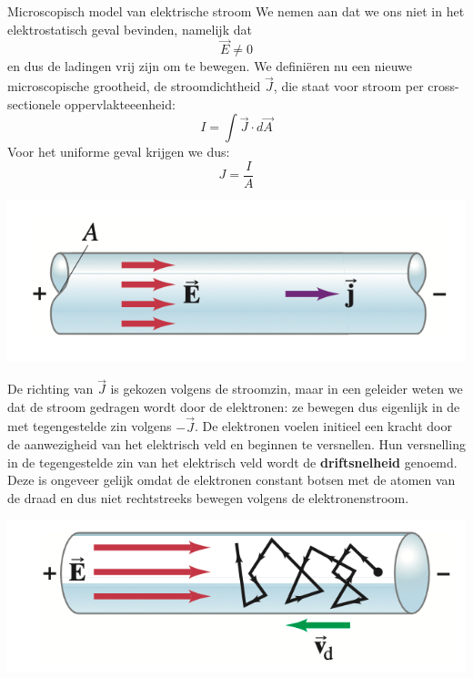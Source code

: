 \begin{app}{Microscopisch model van elektrische stroom}
    We nemen aan dat we ons niet in het elektrostatisch geval bevinden, namelijk dat
    \begin{equation*}
        \Vec{E} \neq 0
    \end{equation*}
    en dus de ladingen vrij zijn om te bewegen. We definiëren nu een nieuwe microscopische grootheid, de stroomdichtheid $\Vec{J}$, die staat voor stroom per cross-sectionele oppervlakteeenheid: 
    \begin{equation*}
        I = \int \Vec{J} \cdot d\Vec{A}
    \end{equation*}
    Voor het uniforme geval krijgen we dus:
    \begin{equation*}
        J = \dfrac{I}{A}
    \end{equation*}
    \begin{center}
        \includegraphics[scale = 0.5]{Images/Elektriciteit/MicroscopischStroom.png}
    \end{center}
    De richting van $\Vec{J}$ is gekozen volgens de stroomzin, maar in een geleider weten we dat de stroom gedragen wordt door de elektronen: ze bewegen dus eigenlijk in de met tegengestelde zin volgens $-\Vec{J}$. De elektronen voelen initieel een kracht door de aanwezigheid van het elektrisch veld en beginnen te versnellen. Hun versnelling in de tegengestelde zin van het elektrisch veld wordt de \textbf{driftsnelheid} genoemd. Deze is ongeveer gelijk omdat de elektronen constant botsen met de atomen van de draad en dus niet rechtstreeks bewegen volgens de elektronenstroom.
    \begin{center}
        \includegraphics[scale = 0.53]{Images/Elektriciteit/Driftsnelheid.png}

\end{center}
\end{app}
